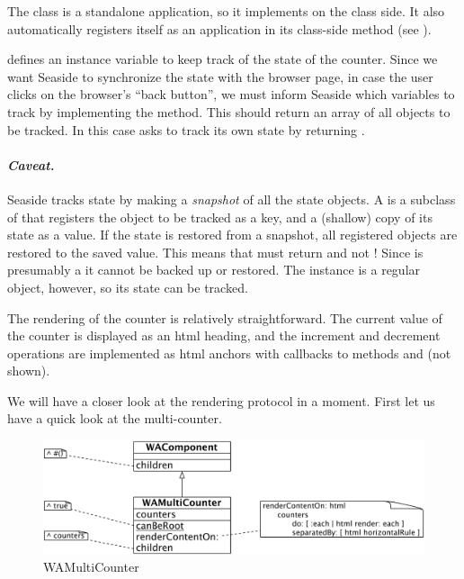 \documentclass[a4paper,10pt,twoside]{book}
\begin{document}
The class  is a standalone application, so it implements  on the class side.
It also automatically registers itself as an application in its class-side  method (see ).

 defines an instance variable  to keep track of the state of the counter.
Since we want Seaside to synchronize the state with the browser page, \ie in case the user clicks on the browser's ``back button'', we must inform Seaside which variables to track by implementing the  method.
This should return an array of all objects to be tracked.
In this case  asks to track its own state by returning .

\paragraph{\emph{Caveat.}}
Seaside tracks state by making a \emph{snapshot} of all the state objects.
A  is a subclass of  that registers the object to be tracked as a key, and a (shallow) copy of its state as a value.
If the state is restored from a snapshot, all registered objects are restored to the saved value.
This means that  must return  and not !  Since  is presumably a  it cannot be backed up or restored. The  instance is a regular object, however, so its state can be tracked.

The rendering of the counter is relatively straightforward.
The current value of the counter is displayed as an html heading, and the increment and decrement operations are implemented as html anchors with callbacks to methods  and  (not shown).

We will have a closer look at the rendering protocol in a moment.
First let us have a quick look at the multi-counter.

\begin{figure}[ht]
\begin{center}
\includegraphics[width=\textwidth]{WAMultiCounter}
\caption{WAMultiCounter}
\label{fig:WAMultiCounter}
\end{center}
\end{figure}
\end{document}
